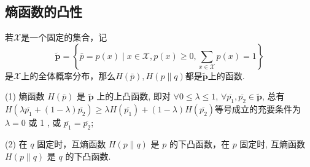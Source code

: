 \subsection{熵函数的凸性}
若$\mathscr{X}$是一个固定的集合，记
$$
 \boldsymbol{\tilde{p}}=\left\{\bar{p}=p(x) \mid x \in \mathscr{X}, p(x) \geqslant 0, \sum_{x \in \mathscr{X}} p(x)=1\right\}
$$
是$\mathscr{X}$上的全体概率分布，那么$H(\bar{p}), H(p \| q)$都是$ \boldsymbol{\tilde{p}}$上的函数.
\begin{theorem}
     (1) 熵函数 $ H(\bar{p}) $ 是 $ \boldsymbol{\tilde{p}} $ 上的上凸函数, 即对 $ \forall 0 \leqslant \lambda \leqslant 1 $, $ \forall \overline{p_{1}}, \overline{p_{2}} \in \boldsymbol{\tilde{p}} $, 总有 $ H\left(\lambda \overline{p_{1}}+(1-\lambda) \overline{p_{2}}\right) \geqslant \lambda H\left(\overline{p_{1}}\right)+(1-\lambda) H\left(\overline{p_{2}}\right) $等号成立的充要条件为 $ \lambda=0 $ 或 1 , 或 $ \overline{p_{1}}=\overline{p_{2}} $;
     
(2) 在 $ q $ 固定时，互熵函数 $ H(p \| q) $ 是 $ p $ 的下凸函数，在 $ p $ 固定时, 互熵函数 $ H(p \| q) $ 是 $ q $ 的下凸函数.
\end{theorem}
